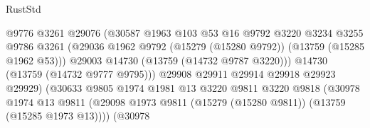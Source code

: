 \begin{lexlean}{RustStd}
\begin{coremodule}
                                            @9776
                                            @3261
                                            @29076
                                            (@30587
                                              @1963
                                              @103
                                              @53
                                              @16
                                              @9792
                                              @3220
                                              @3234
                                              @3255
                                              @9786
                                              @3261
                                              (@29036
                                                @1962
                                                @9792
                                                (@15279 (@15280 @9792))
                                                (@13759 (@15285 @1962 @53)))
                                              @29003
                                              @14730
                                              (@13759 (@14732 @9787 @3220)))
                                            @14730
                                            (@13759 (@14732 @9777 @9795)))
                                          @29908
                                          @29911
                                          @29914
                                          @29918
                                          @29923
                                          @29929)
                                        (@30633
                                          @9805
                                          @1974
                                          @1981
                                          @13
                                          @3220
                                          @9811
                                          @3220
                                          @9818
                                          (@30978
                                            @1974
                                            @13
                                            @9811
                                            (@29098
                                              @1973
                                              @9811
                                              (@15279 (@15280 @9811))
                                              (@13759 (@15285 @1973 @13))))
                                          (@30978

\end{coremodule}
\end{lexlean}

